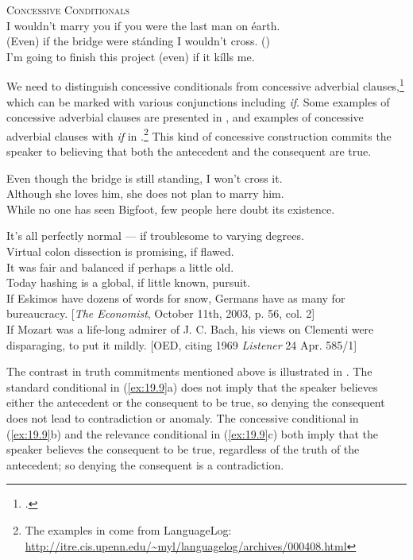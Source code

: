 \ea \label{ex:19.6}
\textsc{Concessive Conditionals}\\
\ea  I wouldn’t marry you if you were the last man on éarth.\\
\ex (Even) if the bridge were stánding I wouldn’t cross. (\citealt{Bennett1982})\\
\ex I’m going to finish this project (even) if it kílls me.
                       \z
\z


We need to distinguish concessive conditionals from concessive adverbial clauses,\footnote{\citet{ThompsonEtAl2007}.} which can be marked with various conjunctions including \textit{if}. Some examples of concessive adverbial clauses are presented in , and examples of concessive adverbial clauses with \textit{if} in .\footnote{The examples in  come from LanguageLog: \url{http://itre.cis.upenn.edu/~myl/languagelog/archives/000408.html}}  This kind of concessive construction commits the speaker to believing that both the antecedent and the consequent are true.


\ea \label{ex:19.7}
\ea  Even though the bridge is still standing, I won’t cross it.\\
\ex Although she loves him, she does not plan to marry him.\\
\ex While no one has seen Bigfoot, few people here doubt its existence.
                       \z
\z

\ea \label{ex:19.8}
\ea  It’s all perfectly normal — if troublesome to varying degrees.\\
\ex Virtual colon dissection is promising, if flawed.\\
\ex It was fair and balanced if perhaps a little old.\\
\ex Today hashing is a global, if little known, pursuit.\\
\ex If Eskimos have dozens of words for snow, Germans have as many for\\
  bureaucracy. [\textit{The Economist}, October 11th, 2003, p. 56, col. 2]\\
\ex If Mozart was a life-long admirer of J. C. Bach, his views on Clementi were\\
  disparaging, to put it mildly.  [OED, citing 1969 \textit{Listener} 24 Apr. 585/1]
                       \z
\z


The contrast in truth commitments mentioned above is illustrated in . The standard conditional in (\ref{ex:19.9}a) does not imply that the speaker believes either the antecedent or the consequent to be true, so denying the consequent does not lead to contradiction or anomaly. The concessive conditional in (\ref{ex:19.9}b) and the relevance conditional in (\ref{ex:19.9}c) both imply that the speaker believes the consequent to be true, regardless of the truth of the antecedent; so denying the consequent is a contradiction.


